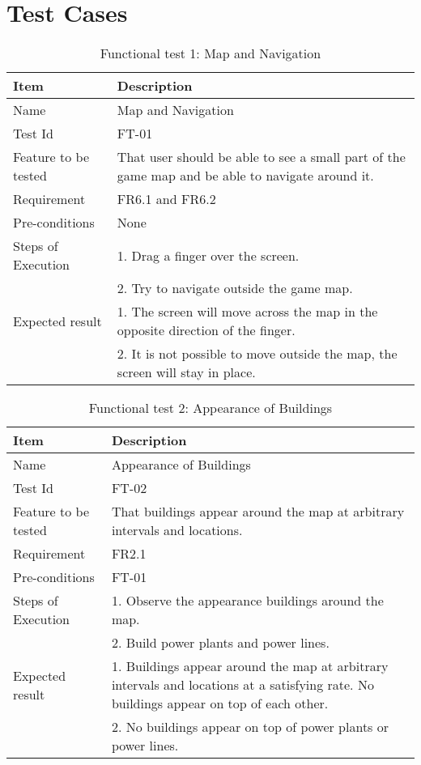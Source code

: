\chapter{Test Cases}


\begin{table}[H]
\centering
	\begin{tabular}{ l | p{8cm} }
		\hline
		\rowcolor{lightgray}
		{\bf Item} & {\bf Description} \\ \hline
		Name & Map and Navigation \\ 
		Test Id & FT-01 \\ 
		Feature to be tested & That user should be able to see a small part of the game map and be able to navigate around it.\\ 
		Requirement & FR6.1 and FR6.2 \\ 
		Pre-conditions & None \\ 
		Steps of Execution & 1. Drag a finger over the screen. \\
		& 2. Try to navigate outside the game map. \\
		Expected result & 1. The screen will move across the map in the opposite direction of the finger.\\ 
		& 2. It is not possible to move outside the map, the screen will stay in place. \\
		\hline
	\end{tabular}
	\caption{Functional test 1: Map and Navigation}
\end{table}

\begin{table}[H]
\centering
	\begin{tabular}{ l | p{8cm} }
		\hline
		\rowcolor{lightgray}
		{\bf Item} & {\bf Description} \\ \hline
		Name & Appearance of Buildings \\ 
		Test Id & FT-02 \\ 
		Feature to be tested & That buildings appear around the map at arbitrary intervals and locations. \\ 
		Requirement & FR2.1 \\ 
		Pre-conditions & FT-01 \\ 
		Steps of Execution & 1. Observe the appearance buildings around the map.\\
		& 2. Build power plants and power lines. \\ 
		Expected result & 1. Buildings appear around the map at arbitrary intervals and locations at a satisfying rate. No buildings appear on top of each other. \\
		& 2. No buildings appear on top of power plants or power lines. \\
		\hline
	\end{tabular}
	\caption{Functional test 2: Appearance of Buildings}
\end{table}

